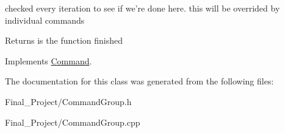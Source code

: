 checked every iteration to see if we're done here. this will be overrided by individual commands 

\begin{DoxyReturn}{Returns}
is the function finished 
\end{DoxyReturn}


Implements \hyperlink{classCommand_a9aa704d5f9d98f510a79e645701dc72a}{Command}.



The documentation for this class was generated from the following files\-:\begin{DoxyCompactItemize}
\item 
Final\-\_\-\-Project/Command\-Group.\-h\item 
Final\-\_\-\-Project/Command\-Group.\-cpp\end{DoxyCompactItemize}
